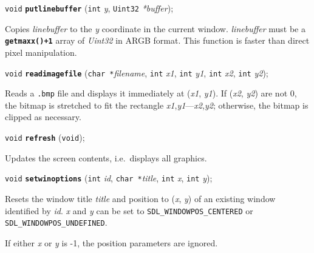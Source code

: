 \documentclass[a4paper,12pt]{article}
\newcommand{\V}{\texttt{void}}      %
\newcommand{\I}{\texttt{int}}       %
\newcommand{\Ut}{\texttt{Uint32}}   %
\newcommand{\C}{\texttt{char *}}    %
\newcommand{\func}[1]{\textbf{\texttt{#1}}}  %
\newcommand{\A}[1]{\emph{#1}}       %
\newcommand{\F}[1]{\texttt{#1}}     %
\newcommand{\T}[1]{\texttt{#1}}     %
\newenvironment{bgi}
{ %
  \begin{snugshade}
}
{ %
  \end{snugshade}
}
\begin{document}
\label{sec:putlinebuffer}

\begin{bgi}
\V{} \func{putlinebuffer} (\I{} \A{y}, \Ut{} \A{*buffer});
\end{bgi}

Copies \A{linebuffer} to the \A{y} coordinate in the current window.
\A{linebuffer} must be a \func{get\-maxx()+1} array of \A{Uint32} in
ARGB format. This function is faster than direct pixel manipulation.


\label{sec:readimagefile}

\begin{bgi}
\V{} \func{readimagefile} (\C{}\A{filename}, \I{} \A{x1}, \I{} \A{y1},
\I{} \A{x2}, \I{} \A{y2});
\end{bgi}

Reads a \F{.bmp} file and displays it immediately at (\A{x1}, \A{y1}).
If (\A{x2}, \A{y2}) are not 0, the bitmap is stretched to fit the
rectangle \A{x1},\A{y1}---\A{x2},\A{y2}; otherwise, the bitmap is
clipped as necessary.


\label{sec:refresh}

\begin{bgi}
\V{} \func{refresh} (\V{});
\end{bgi}

Updates the screen contents, i.e.\ displays all graphics.


\label{sec:resetwinoptions}

\begin{bgi}
\V{} \func{setwinoptions} (\I{} \A{id}, \C{}\A{title}, \I{} \A{x}, \I{} \A{y});
\end{bgi}

Resets the window title \A{title} and position to (\A{x}, \A{y}) of an
existing window identified by \A{id}. \A{x} and \A{y} can be set to
\T{SDL\_WINDOWPOS\_CENTERED} or \T{SDL\_WINDOWPOS\_UNDEFINED}.


If either \A{x} or \A{y} is -1, the position parameters are ignored.
\end{document}
